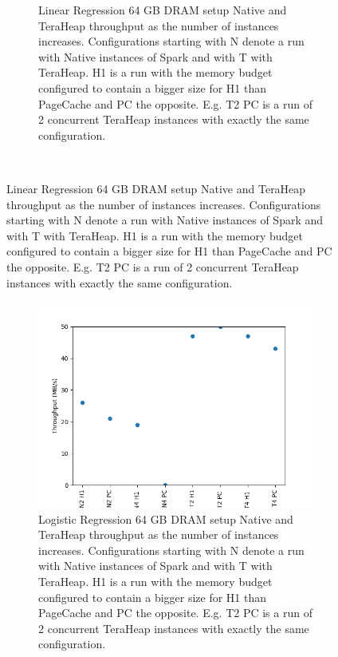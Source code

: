 \begin{figure}[htbp]
\begin{subfigure}[b]{0.48\textwidth}
    \caption{Linear Regression 64 GB DRAM setup Native and TeraHeap
    throughput as the number of instances increases. Configurations
    starting with N denote a run with Native instances of Spark and
    with T with TeraHeap. H1 is a run with the memory budget
    configured to contain a bigger size for H1 than PageCache and PC
    the opposite. E.g. T2 PC is a run of 2 concurrent TeraHeap
    instances with exactly the same configuration.}
	\label{fig:linr_64_thr}
	\end{subfigure}\\[1em]
\end{figure}

\begin{figure}[htbp]
	\centering
	\begin{subfigure}[b]{0.48\textwidth}
        \includegraphics[width=\linewidth]{./fig/LOGR_64_THR.png}
    \caption{Logistic Regression 64 GB DRAM setup Native and TeraHeap
    throughput as the number of instances increases. Configurations
    starting with N denote a run with Native instances of Spark and
    with T with TeraHeap. H1 is a run with the memory budget
    configured to contain a bigger size for H1 than PageCache and PC
    the opposite. E.g. T2 PC is a run of 2 concurrent TeraHeap
    instances with exactly the same configuration.}
	\label{fig:logr_64_thr}
\end{subfigure}
	\begin{subfigure}[b]{0.48\textwidth}

\end{subfigure}
\end{figure}
